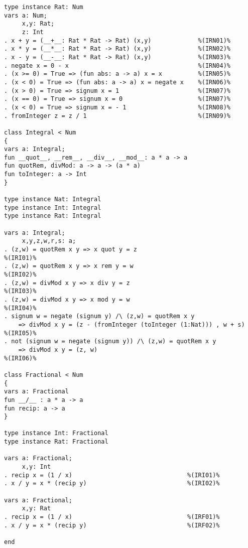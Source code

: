 \begin{Verbatim}
type instance Rat: Num
vars a: Num;
     x,y: Rat;
     z: Int
. x + y = (__+__: Rat * Rat -> Rat) (x,y)             %(IRN01)%
. x * y = (__*__: Rat * Rat -> Rat) (x,y)             %(IRN02)%
. x - y = (__-__: Rat * Rat -> Rat) (x,y)             %(IRN03)%
. negate x = 0 - x                                    %(IRN04)%
. (x >= 0) = True => (fun abs: a -> a) x = x          %(IRN05)%
. (x < 0) = True => (fun abs: a -> a) x = negate x    %(IRN06)%
. (x > 0) = True => signum x = 1                      %(IRN07)%
. (x == 0) = True => signum x = 0                     %(IRN07)%
. (x < 0) = True => signum x = - 1                    %(IRN08)%
. fromInteger z = z / 1                               %(IRN09)%

class Integral < Num
{
vars a: Integral;
fun __quot__, __rem__, __div__, __mod__: a * a -> a
fun quotRem, divMod: a -> a -> (a * a)
fun toInteger: a -> Int
}

type instance Nat: Integral
type instance Int: Integral
type instance Rat: Integral

vars a: Integral;
     x,y,z,w,r,s: a;
. (z,w) = quotRem x y => x quot y = z                                 %(IRI01)%
. (z,w) = quotRem x y => x rem y = w                                  %(IRI02)%
. (z,w) = divMod x y => x div y = z                                   %(IRI03)%
. (z,w) = divMod x y => x mod y = w                                   %(IRI04)%
. signum w = negate (signum y) /\ (z,w) = quotRem x y
    => divMod x y = (z - (fromInteger (toInteger (1:Nat))) , w + s)   %(IRI05)%
. not (signum w = negate (signum y)) /\ (z,w) = quotRem x y 
    => divMod x y = (z, w)                                            %(IRI06)%

class Fractional < Num
{
vars a: Fractional
fun __/__ : a * a -> a
fun recip: a -> a
}

type instance Int: Fractional
type instance Rat: Fractional

vars a: Fractional;
     x,y: Int
. recip x = (1 / x)                                %(IRI01)%
. x / y = x * (recip y)                            %(IRI02)%

vars a: Fractional;
     x,y: Rat
. recip x = (1 / x)                                %(IRF01)%
. x / y = x * (recip y)                            %(IRF02)%

end
\end{Verbatim}

